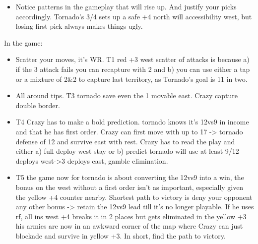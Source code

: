 \begin{itemize}
\begin{enumerate}
\begin{itemize}
            \item c: yellow +3/purple +5 FTB, W: yellow +3 vs e: W: red +3, N: yellow +4, N: red+3
            \item e: yellow+3/red+3 FTB, yellow +4 vs c: W: red +3/yellow +3, purple +5.
        \end{itemize}
        \item c) gets first pick: c has FTB into yellow +3 west, 11 end of t2, but is far away from threatening income e) stabilizes at 12, tries to keep the game 12vs11 and c) has to foresee the flank north in 2 steps to triple border.
        \item e) gets first pick: e has FTB red +3 into yellow +4 that t3 immediately moves south, it's a race of who breaks who first. c) has purple +5 which is 3 steps away from single border into yellow +4 (assuming breaks). e) sees red +3 in 1 turn and had an FTB -> e has an advantage.
    \end{enumerate}
    \item Notice patterns in the gameplay that will rise up. And justify your picks accordingly. Tornado's 3/4 sets up a safe +4 north will accessibility west, but losing first pick always makes things ugly.
\end{itemize}

In the game:
\begin{itemize}
    \item Scatter your moves, it's WR. T1 red +3 west scatter of attacks is because a) if the 3 attack fails you can recapture with 2 and b) you can use either a tap or a mixture of 2\&2 to capture last territory, as Tornado's goal is 11 in two.
    \item All around tips. T3 tornado save even the 1 movable east. Crazy capture double border.
    \item T4 Crazy has to make a bold prediction. tornado knows it's 12vs9 in income and that he has first order. Crazy can first move with up to 17 -> tornado defense of 12 and survive east with rest. Crazy has to read the play and either a) full deploy west stay or b) predict tornado will use at least 9/12 deploys west->3 deploys east, gamble elimination.
    \item T5 the game now for tornado is about converting the 12vs9 into a win, the bonus on the west without a first order isn't as important, especially given the yellow +4 counter nearby. Shortest path to victory is deny your opponent any other bonus -> retain the 12vs9 lead till it's no longer playable. If he uses rf, all ins west +4 breaks it in 2 places but gets eliminated in the yellow +3 his armies are now in an awkward corner of the map where Crazy can just blockade and survive in yellow +3.
In short, find the path to victory.
\end{itemize}